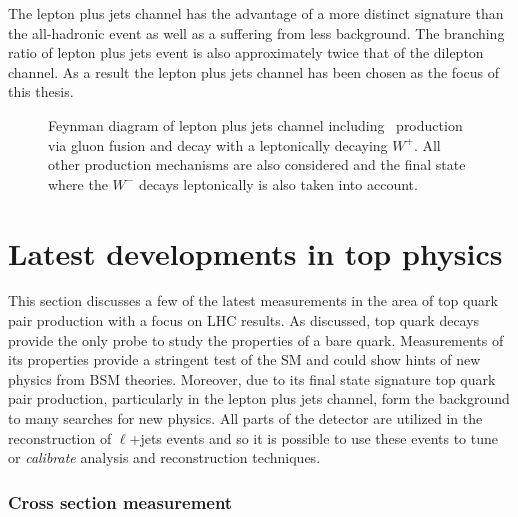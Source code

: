The lepton plus jets channel has the advantage of a more distinct signature than the all-hadronic event as well as a suffering from less background. The branching ratio of lepton plus jets event is also approximately twice that of the dilepton channel. As a result the lepton plus jets channel has been chosen as the focus of this thesis.

\begin{figure}[htbp]
  \centering
  \begin{minipage}[][][t]{.60\textwidth}
  
  \end{minipage}
  \caption[Feynman diagram of lepton plus jets channel including \ttbar\ production via gluon fusion and decay with a leptonically decaying $W^{+}$.]{Feynman diagram of lepton plus jets channel including \ttbar\ production via gluon fusion and decay with a leptonically decaying $W^{+}$. All other production mechanisms are also considered and the final state where the $W^-$ decays leptonically is also taken into account.}\label{fig:TopQuarkFullLPlusJets}
\end{figure}

\section{Latest developments in top physics}

This section discusses a few of the latest measurements in the area of top quark pair production with a focus on LHC results. As discussed, top quark decays provide the only probe to study the properties of a bare quark. Measurements of its properties provide a stringent test of the SM and could show hints of new physics from BSM theories. Moreover, due to its final state signature top quark pair production, particularly in the lepton plus jets channel, form the background to many searches for new physics.  All parts of the detector are utilized in the reconstruction of $\ell$+jets events and so it is possible to use these events to tune or \textit{calibrate} analysis and reconstruction techniques.

\subsubsection{Cross section measurement}

